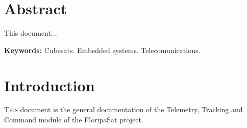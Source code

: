 \documentclass[12pt]{book}
\begin{document}
\chapter*{Abstract}

This document...

\smallskip
\noindent \textbf{Keywords:} Cubesats. Embedded systems. Telecomunications.

\tableofcontents


\listoffigures
{}


\listoftables
{}


\printnomenclature
{}


\chapter{Introduction}


\lettrine{T}{his} document is the general documentation of the Telemetry, Tracking and Command module of the FloripaSat project.
\end{document}
